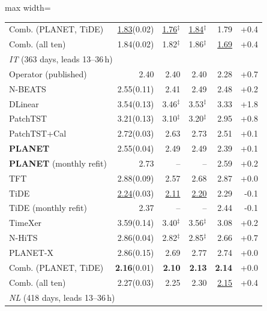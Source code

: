 \begin{table}[!t]
\begin{adjustbox}{max width=\linewidth}
\begin{tabular}{lrrrrr}
\quad Comb. (PLANET, TiDE) & \underline{1.83}{\scriptsize\color{gray}(0.02)} & \underline{1.76}$^{\ddagger}$ & \underline{1.84}$^{\ddagger}$ & 1.79 & +0.4 \\
\quad Comb. (all ten) & 1.84{\scriptsize\color{gray}(0.02)} & 1.82$^{\ddagger}$ & 1.86$^{\ddagger}$ & \underline{1.69} & +0.4 \\
\midrule
\multicolumn{6}{l}{\textit{IT} (363 days, leads 13--36\,h)} \\
\quad Operator (published) & 2.40 & 2.40 & 2.40 & 2.28 & +0.7 \\
\quad N-BEATS & 2.55{\scriptsize\color{gray}(0.11)} & 2.41 & 2.49 & 2.48 & +0.2 \\
\quad DLinear & 3.54{\scriptsize\color{gray}(0.13)} & 3.46$^{\ddagger}$ & 3.53$^{\ddagger}$ & 3.33 & +1.8 \\
\quad PatchTST & 3.21{\scriptsize\color{gray}(0.13)} & 3.10$^{\ddagger}$ & 3.20$^{\ddagger}$ & 2.95 & +0.8 \\
\quad PatchTST+Cal & 2.72{\scriptsize\color{gray}(0.03)} & 2.63 & 2.73 & 2.51 & +0.1 \\
\quad \textbf{PLANET} & 2.55{\scriptsize\color{gray}(0.04)} & 2.49 & 2.49 & 2.39 & +0.1 \\
\quad \textbf{PLANET} (monthly refit) & 2.73 & -- & -- & 2.59 & +0.2 \\
\quad TFT & 2.88{\scriptsize\color{gray}(0.09)} & 2.57 & 2.68 & 2.87 & +0.0 \\
\quad TiDE & \underline{2.24}{\scriptsize\color{gray}(0.03)} & \underline{2.11} & \underline{2.20} & 2.29 & -0.1 \\
\quad TiDE (monthly refit) & 2.37 & -- & -- & 2.44 & -0.1 \\
\quad TimeXer & 3.59{\scriptsize\color{gray}(0.14)} & 3.40$^{\ddagger}$ & 3.56$^{\ddagger}$ & 3.08 & +0.2 \\
\quad N-HiTS & 2.86{\scriptsize\color{gray}(0.04)} & 2.82$^{\ddagger}$ & 2.85$^{\ddagger}$ & 2.66 & +0.7 \\
\quad PLANET-X & 2.86{\scriptsize\color{gray}(0.15)} & 2.69 & 2.77 & 2.74 & +0.0 \\
\quad Comb. (PLANET, TiDE) & \textbf{2.16}{\scriptsize\color{gray}(0.01)} & \textbf{2.10} & \textbf{2.13} & \textbf{2.14} & +0.0 \\
\quad Comb. (all ten) & 2.27{\scriptsize\color{gray}(0.03)} & 2.25 & 2.30 & \underline{2.15} & +0.4 \\
\midrule
\multicolumn{6}{l}{\textit{NL} (418 days, leads 13--36\,h)} \\

\end{tabular}
\end{adjustbox}
\end{table}
